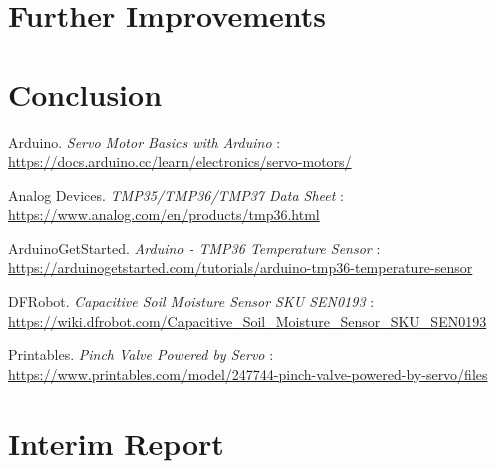 \documentclass[a4paper,11pt]{article}
\begin{document}
\section{Further Improvements}
\label{sec:further_improvements}

\section{Conclusion}
\label{sec:conclusion}


\newpage
\appendix
\begin{thebibliography}{9}

Arduino. \textit{Servo Motor Basics with Arduino} : \\
\url{https://docs.arduino.cc/learn/electronics/servo-motors/}

Analog Devices. \textit{TMP35/TMP36/TMP37 Data Sheet} : \\
\url{https://www.analog.com/en/products/tmp36.html} 

ArduinoGetStarted. \textit{Arduino - TMP36 Temperature Sensor} : \\
\url{https://arduinogetstarted.com/tutorials/arduino-tmp36-temperature-sensor}

DFRobot. \textit{Capacitive Soil Moisture Sensor SKU SEN0193} : \\
\url{https://wiki.dfrobot.com/Capacitive_Soil_Moisture_Sensor_SKU_SEN0193}

Printables. \textit{Pinch Valve Powered by Servo} : \\
\url{https://www.printables.com/model/247744-pinch-valve-powered-by-servo/files}

\end{thebibliography}

\section{Interim Report}
\end{document}
